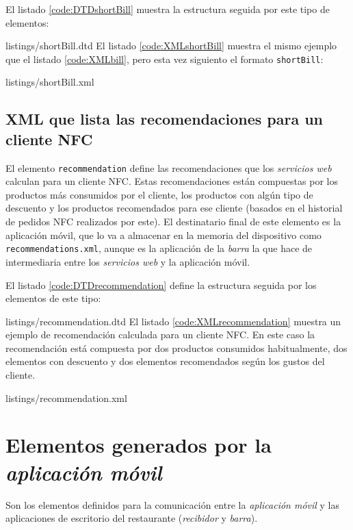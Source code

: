 El listado \ref{code:DTDshortBill} muestra la estructura seguida por este tipo 
de elementos:

{listings/shortBill.dtd}
El listado \ref{code:XMLshortBill} muestra el mismo ejemplo que el listado
\ref{code:XMLbill}, pero esta vez siguiento el formato \texttt{shortBill}:

{listings/shortBill.xml}

\subsection{\acs{XML} que lista las recomendaciones para un cliente \acs{NFC}}
El elemento \texttt{recommendation} define las recomendaciones que los
\emph{servicios web} calculan para un cliente \acs{NFC}. Estas recomendaciones
están compuestas por los productos más consumidos por el cliente, los
productos con algún tipo de descuento y los productos recomendados para ese
cliente (basados en el historial de pedidos \acs{NFC} realizados por este).
El destinatario final de este elemento es la aplicación móvil, que lo va a
almacenar en la memoria del dispositivo como \texttt{recommendations.xml},
aunque es la aplicación de la \emph{barra} la que hace de intermediaria entre
los \emph{servicios web} y la aplicación móvil.

El listado \ref{code:DTDrecommendation} define la estructura seguida por los 
elementos de este tipo:

{listings/recommendation.dtd}
El listado \ref{code:XMLrecommendation} muestra un ejemplo de recomendación
calculada para un cliente \acs{NFC}. En este caso la recomendación está
compuesta por dos productos consumidos habitualmente, dos elementos con
descuento y dos elementos recomendados según los gustos del cliente.

{listings/recommendation.xml}

\section{Elementos generados por la \emph{aplicación móvil}}
Son los elementos definidos para la comunicación entre la \emph{aplicación
móvil} y las aplicaciones de escritorio del restaurante (\emph{recibidor} y
\emph{barra}).
